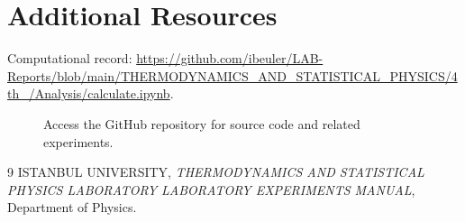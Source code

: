 \documentclass[journal]{IEEEtran}
\begin{document}
\section{Additional Resources}
Computational record: \url{https://github.com/ibeuler/LAB-Reports/blob/main/THERMODYNAMICS_AND_STATISTICAL_PHYSICS/4th_/Analysis/calculate.ipynb}.

\begin{figure}[H]
    \centering
    \begin{minipage}{0.15\textwidth}
        \centering
    \end{minipage}%
    \begin{minipage}{0.2\textwidth}
        \raggedright
        \caption{Access the GitHub repository for source code and related experiments.}
        \label{fig:qr_code}
    \end{minipage}
\end{figure}

\begin{thebibliography}{9}
    ISTANBUL UNIVERSITY, \textit{THERMODYNAMICS AND
STATISTICAL PHYSICS
LABORATORY LABORATORY EXPERIMENTS MANUAL}, Department of Physics.


\end{thebibliography}
\end{document}
